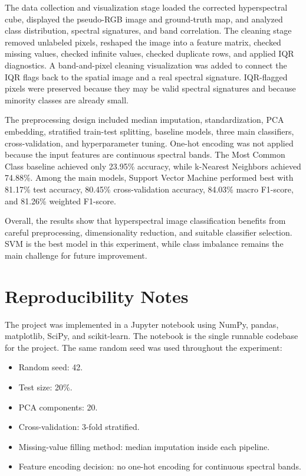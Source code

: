 \documentclass[12pt,a4paper]{article}
\begin{document}
The data collection and visualization stage loaded the corrected hyperspectral cube, displayed the pseudo-RGB image and ground-truth map, and analyzed class distribution, spectral signatures, and band correlation. The cleaning stage removed unlabeled pixels, reshaped the image into a feature matrix, checked missing values, checked infinite values, checked duplicate rows, and applied IQR diagnostics. A band-and-pixel cleaning visualization was added to connect the IQR flags back to the spatial image and a real spectral signature. IQR-flagged pixels were preserved because they may be valid spectral signatures and because minority classes are already small.

The preprocessing design included median imputation, standardization, PCA embedding, stratified train-test splitting, baseline models, three main classifiers, cross-validation, and hyperparameter tuning. One-hot encoding was not applied because the input features are continuous spectral bands. The Most Common Class baseline achieved only 23.95\% accuracy, while k-Nearest Neighbors achieved 74.88\%. Among the main models, Support Vector Machine performed best with 81.17\% test accuracy, 80.45\% cross-validation accuracy, 84.03\% macro F1-score, and 81.26\% weighted F1-score.

Overall, the results show that hyperspectral image classification benefits from careful preprocessing, dimensionality reduction, and suitable classifier selection. SVM is the best model in this experiment, while class imbalance remains the main challenge for future improvement.

\newpage
\appendix

\section{Reproducibility Notes}

The project was implemented in a Jupyter notebook using NumPy, pandas, matplotlib, SciPy, and scikit-learn. The notebook is the single runnable codebase for the project. The same random seed was used throughout the experiment:

\begin{itemize}
    \item Random seed: 42.
    \item Test size: 20\%.
    \item PCA components: 20.
    \item Cross-validation: 3-fold stratified.
    \item Missing-value filling method: median imputation inside each pipeline.
    \item Feature encoding decision: no one-hot encoding for continuous spectral bands.
\end{itemize}
\end{document}
